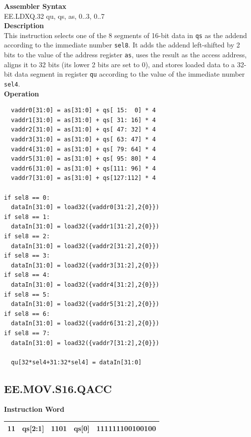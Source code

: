 \textbf{Assembler Syntax} \\
EE.LDXQ.32 qu, qs, as, 0..3, 0..7 \\
\textbf{Description} \\
This instruction selects one of the 8 segments of 16-bit data in \lstinline{qs} as the addend according to the immediate number \lstinline{sel8}. It adds the addend left-shifted by 2 bits to the value of the address register \lstinline{as}, uses the result as the access address, aligns it to 32 bits (its lower 2 bits are set to 0), and stores loaded data to a 32-bit data segment in register \lstinline{qu} according to the value of the immediate number \lstinline{sel4}. \\
\textbf{Operation}
\begin{lstlisting}
  vaddr0[31:0] = as[31:0] + qs[ 15:  0] * 4
  vaddr1[31:0] = as[31:0] + qs[ 31: 16] * 4
  vaddr2[31:0] = as[31:0] + qs[ 47: 32] * 4
  vaddr3[31:0] = as[31:0] + qs[ 63: 47] * 4
  vaddr4[31:0] = as[31:0] + qs[ 79: 64] * 4
  vaddr5[31:0] = as[31:0] + qs[ 95: 80] * 4
  vaddr6[31:0] = as[31:0] + qs[111: 96] * 4
  vaddr7[31:0] = as[31:0] + qs[127:112] * 4

if sel8 == 0:
  dataIn[31:0] = load32({vaddr0[31:2],2{0}})
if sel8 == 1:
  dataIn[31:0] = load32({vaddr1[31:2],2{0}})
if sel8 == 2:
  dataIn[31:0] = load32({vaddr2[31:2],2{0}})
if sel8 == 3:
  dataIn[31:0] = load32({vaddr3[31:2],2{0}})
if sel8 == 4:
  dataIn[31:0] = load32({vaddr4[31:2],2{0}})
if sel8 == 5:
  dataIn[31:0] = load32({vaddr5[31:2],2{0}})
if sel8 == 6:
  dataIn[31:0] = load32({vaddr6[31:2],2{0}})
if sel8 == 7:
  dataIn[31:0] = load32({vaddr7[31:2],2{0}})

  qu[32*sel4+31:32*sel4] = dataIn[31:0]
\end{lstlisting}

\clearpage
\subsection{EE.MOV.S16.QACC}\label{instruction:EEMOVS16QACC}
\setlength\tabcolsep{6pt}
\textbf{Instruction Word} \\
\begin{tabular}{|c|c|c|c|c|}
	\hline
	11 & qs[2:1] & 1101 & qs[0] & 111111100100100 \\
	\hline
\end{tabular}

